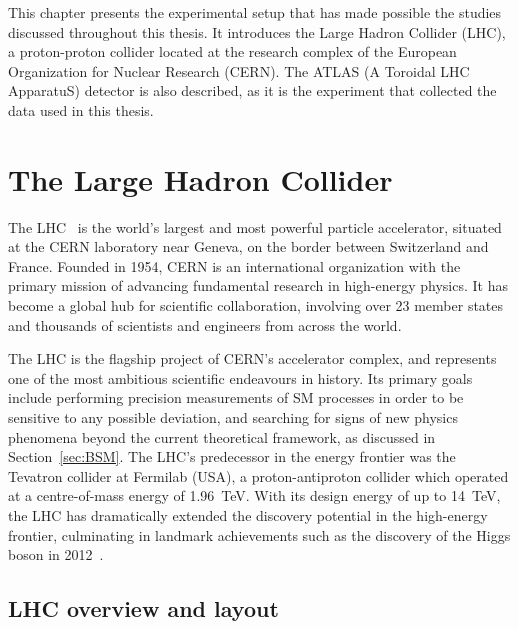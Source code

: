 This chapter presents the experimental setup that has made possible the studies discussed throughout this thesis. It introduces the Large Hadron Collider (LHC), a proton-proton collider located at the research complex of the European Organization for Nuclear Research (CERN). The ATLAS (A Toroidal LHC ApparatuS) detector is also described, as it is the experiment that collected the data used in this thesis.

\section{The Large Hadron Collider}
\label{sec:LHC}

The LHC~\cite{Evans:1129806, Bruning:782076} is the world's largest and most powerful particle accelerator, situated at the CERN laboratory near Geneva, on the border between Switzerland and France. Founded in 1954, CERN is an international organization with the primary mission of advancing fundamental research in high-energy physics. It has become a global hub for scientific collaboration, involving over 23 member states and thousands of scientists and engineers from across the world.

The LHC is the flagship project of CERN's accelerator complex, and represents one of the most ambitious scientific endeavours in history. Its primary goals include performing precision measurements of SM processes in order to be sensitive to any possible deviation, and searching for signs of new physics phenomena beyond the current theoretical framework, as discussed in Section~\ref{sec:BSM}. The LHC's predecessor in the energy frontier was the Tevatron collider at Fermilab (USA), a proton-antiproton collider which operated at a centre-of-mass energy of 1.96~TeV. With its design energy of up to 14~TeV, the LHC has dramatically extended the discovery potential in the high-energy frontier, culminating in landmark achievements such as the discovery of the Higgs boson in 2012~\cite{ATLAS:2012yve,CMS:2012qbp}.

\subsection{LHC overview and layout}

